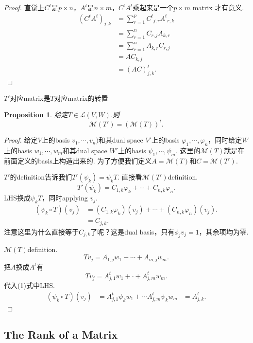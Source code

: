 \documentclass{article}
\newtheorem{proposition}[theorem]{Proposition}
\begin{document}
\begin{proof}
直觉上$C^t$是$p\times n$，$A^t$是$n \times m$，$C^tA^t$乘起来是一个$p \times m$ matrix 才有意义.
$$
\begin{aligned}
(C^tA^t)_{j,k} &= \sum\limits_{r=1}^p {C^t}_{j,r}{A^t}_{r,k} \\
			&= \sum\limits_{r=1}^n {C}_{r,j}{A}_{k,r} \\
			&= \sum\limits_{r=1}^n {A}_{k,r}{C}_{r,j} \\
			&= AC_{k,j} \\
			&= (AC)^t_{j,k}.
\end{aligned}
$$
\end{proof}

{\color{red} $T'$对应matrix是$T$对应matrix的转置}

\begin{proposition}
给定$T \in \mathcal{L}(V,W)$.则
$$
	\mathcal{M}(T') = (\mathcal{M}(T))^t.
$$
\end{proposition}

\begin{proof}
给定$V$上的basis $v_1,\cdots,v_n)$和其dual space $V'$上的basis $\varphi_1,\cdots,\varphi_n$，同时给定$W$上的basis $w_1,\cdots,w_m$和其dual space $W'$上的basis $\psi_1,\cdots,\psi_m$. 这里的$\mathcal{M}(T)$就是在前面定义的basis上构造出来的. 为了方便我们定义$A = \mathcal{M}(T)$和$C = \mathcal{M}(T')$.

$T'$的definition告诉我们$T'(\psi_k)= \psi_k T$. 直接看$\mathcal{M}(T')$definition.
$$
T'(\psi_k) = C_{1,k}\varphi_k + \cdots + C_{n,k}\varphi_n.
$$
LHS换成$\psi_kT$，同时applying $v_j$.
\begin{equation}
\begin{aligned}
(\psi_k \circ T)(v_j) &= (C_{1,k}\varphi_k)(v_j) + \cdots + (C_{n,k} \varphi_n)(v_j). \\
&= C_{j,k}.
\end{aligned}
\end{equation}
注意这里为什么直接等于$C_{j,k}$了呢？这是dual basis，只有$\phi_jv_j = 1$，其余项均为零.

$\mathcal{M}(T)$definition.
$$
Tv_j = A_{1,j}w_1 + \cdots + A_{m,j}w_m . 
$$
把$A$换成$A^t$有
$$
Tv_j  = A^t_{j,1}w_1 + \cdot + A^t_{j,m}w_m.
$$
代入(1)式中LHS.
$$
\begin{aligned}
(\psi_k \circ T)(v_j) &= A^t_{j,1}\psi_kw_1 + \cdots A^t_{j,m}\psi_kw_m
&= A^t_{j,k}.
\end{aligned}
$$
\end{proof}

\newpage
\subsection{The Rank of a Matrix}
\end{document}
